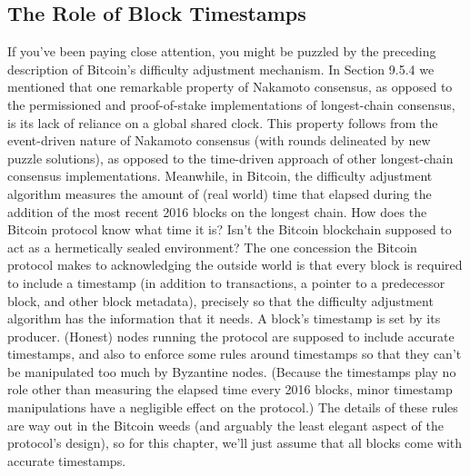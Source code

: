 \subsection{The Role of Block Timestamps}
If you’ve been paying close attention, you might be puzzled by the preceding description of
Bitcoin’s difficulty adjustment mechanism. In Section 9.5.4 we mentioned that one remarkable
property of Nakamoto consensus, as opposed to the permissioned and proof-of-stake implementations of longest-chain consensus, is its lack of reliance on a global shared clock. This
property follows from the event-driven nature of Nakamoto consensus (with rounds delineated by new puzzle solutions), as opposed to the time-driven approach of other longest-chain
consensus implementations.
Meanwhile, in Bitcoin, the difficulty adjustment algorithm measures the amount of (real world) time that elapsed during the addition of the most recent 2016 blocks on the longest
chain. How does the Bitcoin protocol know what time it is? Isn’t the Bitcoin blockchain
supposed to act as a hermetically sealed environment?
The one concession the Bitcoin protocol makes to acknowledging the outside world is
that every block is required to include a timestamp (in addition to transactions, a pointer to
a predecessor block, and other block metadata), precisely so that the difficulty adjustment
algorithm has the information that it needs. A block’s timestamp is set by its producer.
(Honest) nodes running the protocol are supposed to include accurate timestamps, and also
to enforce some rules around timestamps so that they can’t be manipulated too much by
Byzantine nodes. (Because the timestamps play no role other than measuring the elapsed
time every 2016 blocks, minor timestamp manipulations have a negligible effect on the protocol.) The details of these rules are way out in the Bitcoin weeds (and arguably the least
elegant aspect of the protocol’s design), so for this chapter, we’ll just assume that all blocks
come with accurate timestamps. 
